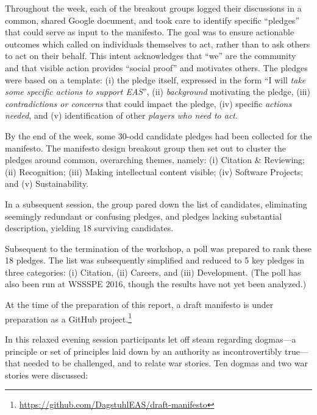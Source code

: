 \documentclass[a4paper,UKenglish]{dagrep}
\begin{document}
Throughout the week, each of the breakout groups logged their discussions in a common, shared Google document, and took care to identify specific ``pledges'' that could serve as input to the manifesto. The goal was to ensure actionable outcomes which called on individuals themselves to act, rather than to ask others to act on their behalf. This intent acknowledges that ``we'' are the community and that visible action provides ``social proof'' and motivates others. The pledges were based on a template: (i) the pledge itself, expressed in the form ``I will \emph{take some specific actions to support EAS}'', (ii) \emph{background} motivating the pledge, (iii) \emph{contradictions or concerns} that could impact the pledge, (iv) specific \emph{actions needed}, and (v) identification of other \emph{players who need to act}.

By the end of the week, some 30-odd candidate pledges had been collected for the manifesto.
The manifesto design breakout group then set out to cluster the pledges around common, overarching themes, namely:
(i) Citation \& Reviewing;
(ii) Recognition;
(iii) Making intellectual content visible;
(iv) Software Projects; and
(v) Sustainability.

In a subsequent session, the group pared down the list of candidates, eliminating seemingly redundant or confusing pledges, and pledges lacking substantial description, yielding 18 surviving candidates.

Subsequent to the termination of the workshop, a poll was prepared to rank these 18 pledges. The list was subsequently simplified and reduced to 5 key pledges in three categories: (i) Citation, (ii) Careers, and (iii) Development.
(The poll has also been run at WSSSPE 2016, though the results have not yet been analyzed.)

At the time of the preparation of this report, a draft manifesto is under preparation as a GitHub project.\footnote{\url{https://github.com/DagstuhlEAS/draft-manifesto}}


In this relaxed evening session participants let off steam regarding dogmas---a principle or set of principles laid down by an authority as incontrovertibly true---that needed to be challenged, and to relate war stories. Ten dogmas and two war stories were discussed:
\end{document}
